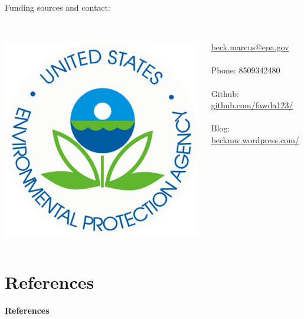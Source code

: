 \documentclass[serif]{beamer}\usepackage[]{graphicx}\usepackage[]{color}
\begin{document}
\begin{frame}
\vfill
Funding sources and contact:\\~\\
\begin{columns}
\begin{column}{0.5\textwidth}
\centerline{\includegraphics[width=0.4\linewidth]{fig/epa_logo.png}}
\end{column}
\begin{column}{0.5\textwidth}
\scriptsize
\href{mailto:beck.marcus@epa.gov}{beck.marcus@epa.gov} \\~\\
Phone: 8509342480 \\~\\
Github: \href{https://github.com/fawda123/}{github.com/fawda123/} \\~\\
Blog: \href{http://beckmw.wordpress.com/}{beckmw.wordpress.com/}
\end{column}
\end{columns}
\vspace{0.2in}
\end{frame}

\section{References}
\begin{frame}[allowframebreaks,t]{\textbf{References}}
\footnotesize
{}


\end{frame}
\end{document}

